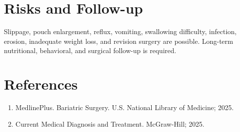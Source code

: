 \section*{Risks and Follow-up}
Slippage, pouch enlargement, reflux, vomiting, swallowing difficulty, infection, erosion, inadequate weight loss, and revision surgery are possible. Long-term nutritional, behavioral, and surgical follow-up is required.

\section*{References}
\begin{enumerate}
  \item MedlinePlus. Bariatric Surgery. U.S. National Library of Medicine; 2025.
  \item Current Medical Diagnosis and Treatment. McGraw-Hill; 2025.
\end{enumerate}
\clearpage
